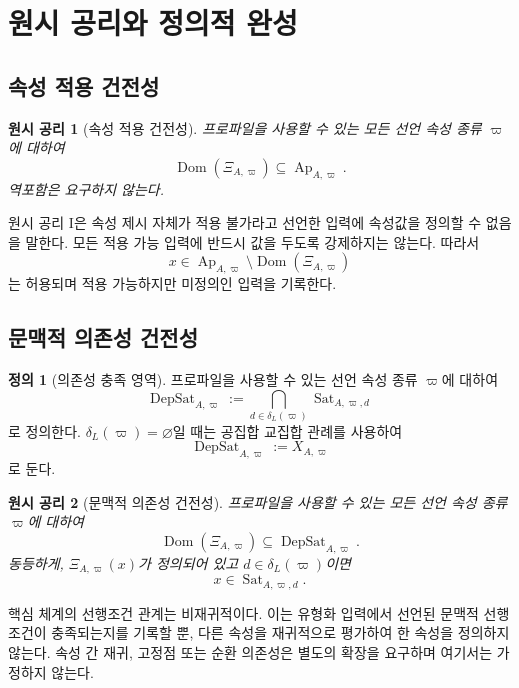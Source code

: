 \documentclass[11pt]{article}
\newcommand{\Ap}{\operatorname{Ap}}
\newcommand{\DepSat}{\operatorname{DepSat}}
\newcommand{\Sat}{\operatorname{Sat}}
\newcommand{\Dom}{\operatorname{Dom}}
\newtheorem{axiom}{원시 공리}
\theoremstyle{definition}
\newtheorem{definition}[theorem]{정의}
\theoremstyle{remark}
\begin{document}
\section{원시 공리와 정의적 완성}
\label{sec:axioms}

\subsection{속성 적용 건전성}

\begin{axiom}[속성 적용 건전성]
\label{ax:application}
프로파일을 사용할 수 있는 모든 선언 속성 종류 \(\varpi\)에 대하여
\[
\Dom(\Xi_{A,\varpi})\subseteq\Ap_{A,\varpi}.
\]
역포함은 요구하지 않는다.
\end{axiom}

원시 공리 I은 속성 제시 자체가 적용 불가라고 선언한 입력에 속성값을 정의할 수 없음을 말한다.
모든 적용 가능 입력에 반드시 값을 두도록 강제하지는 않는다.
따라서
\[
x\in\Ap_{A,\varpi}\setminus\Dom(\Xi_{A,\varpi})
\]
는 허용되며 적용 가능하지만 미정의인 입력을 기록한다.

\subsection{문맥적 의존성 건전성}

\begin{definition}[의존성 충족 영역]
프로파일을 사용할 수 있는 선언 속성 종류 \(\varpi\)에 대하여
\[
\DepSat_{A,\varpi}:=
\bigcap_{d\in\delta_L(\varpi)}\Sat_{A,\varpi,d}
\]
로 정의한다.
\(\delta_L(\varpi)=\varnothing\)일 때는 공집합 교집합 관례를 사용하여
\[
\DepSat_{A,\varpi}:=X_{A,\varpi}
\]
로 둔다.
\end{definition}

\begin{axiom}[문맥적 의존성 건전성]
\label{ax:dependency}
프로파일을 사용할 수 있는 모든 선언 속성 종류 \(\varpi\)에 대하여
\[
\Dom(\Xi_{A,\varpi})\subseteq\DepSat_{A,\varpi}.
\]
동등하게, \(\Xi_{A,\varpi}(x)\)가 정의되어 있고 \(d\in\delta_L(\varpi)\)이면
\[
x\in\Sat_{A,\varpi,d}.
\]
\end{axiom}

핵심 체계의 선행조건 관계는 비재귀적이다.
이는 유형화 입력에서 선언된 문맥적 선행조건이 충족되는지를 기록할 뿐, 다른 속성을 재귀적으로 평가하여 한 속성을 정의하지 않는다.
속성 간 재귀, 고정점 또는 순환 의존성은 별도의 확장을 요구하며 여기서는 가정하지 않는다.
\end{document}
